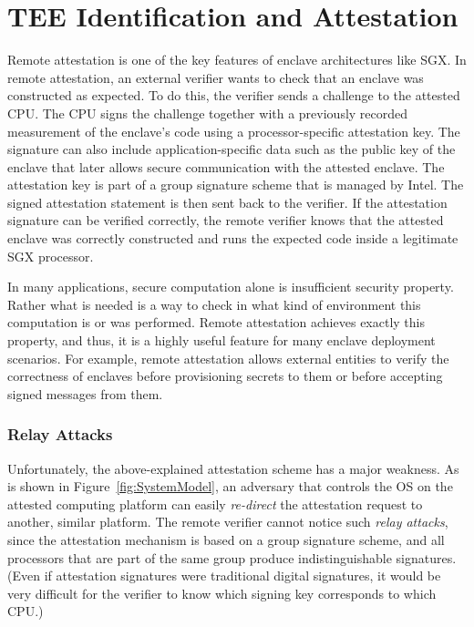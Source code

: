 
\section*{TEE Identification and Attestation}

Remote attestation is one of the key features of enclave architectures like SGX. In remote attestation, an external verifier wants to check that an enclave was constructed as expected. To do this, the verifier sends a challenge to the attested CPU. The CPU signs the challenge together with a previously recorded measurement of the enclave's code using a processor-specific attestation key. The signature can also include application-specific data such as the public key of the enclave that later allows secure communication with the attested enclave. The attestation key is part of a group signature scheme that is managed by Intel. The signed attestation statement is then sent back to the verifier. If the attestation signature can be verified correctly, the remote verifier knows that the attested enclave was correctly constructed and runs the expected code inside a legitimate SGX processor. 

In many applications, secure computation alone is insufficient security property. Rather what is needed is a way to check in what kind of environment this computation is or was performed. Remote attestation achieves exactly this property, and thus, it is a highly useful feature for many enclave deployment scenarios. For example, remote attestation allows external entities to verify the correctness of enclaves before provisioning secrets to them or before accepting signed messages from them.  

\subsubsection*{Relay Attacks}

Unfortunately, the above-explained attestation scheme has a major weakness. As is shown in Figure~\ref{fig:SystemModel}, an adversary that controls the OS on the attested computing platform can easily \emph{re-direct} the attestation request to another, similar platform. The remote verifier cannot notice such \emph{relay attacks}, since the attestation mechanism is based on a group signature scheme, and all processors that are part of the same group produce indistinguishable signatures. (Even if attestation signatures were traditional digital signatures, it would be very difficult for the verifier to know which signing key corresponds to which CPU.) 

